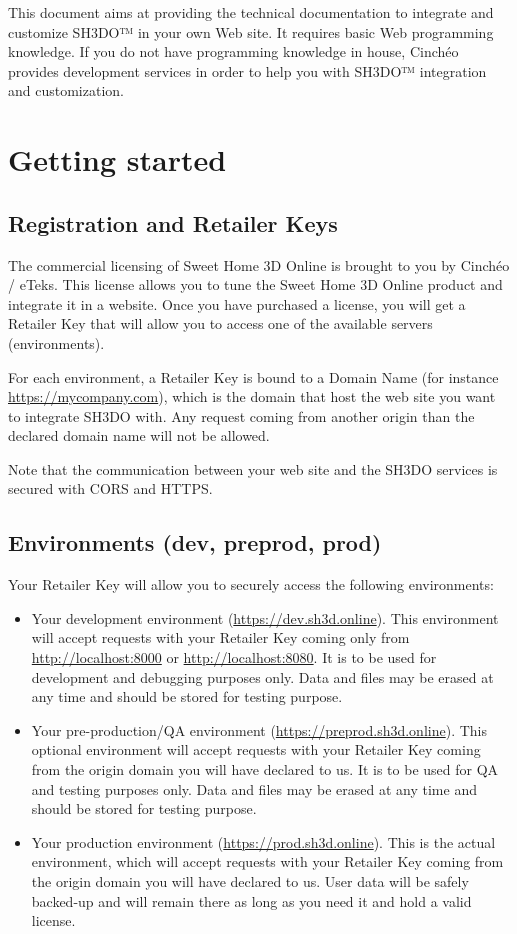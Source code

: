 \documentclass[a4paper]{report}
\begin{document}
This document aims at providing the technical documentation to integrate and customize SH3DO™ in your own Web site. It requires basic Web programming knowledge. If you do not have programming knowledge in house, Cinchéo provides development services in order to help you with SH3DO™ integration and customization.

\chapter{Getting started} 

\section{Registration and Retailer Keys}

The commercial licensing of Sweet Home 3D Online is brought to you by Cinchéo / eTeks. This license allows you to tune the Sweet Home 3D Online product and integrate it in a website. Once you have purchased a license, you will get a Retailer Key that will allow you to access one of the available servers (environments).

For each environment, a Retailer Key is bound to a Domain Name (for instance \url{https://mycompany.com}), which is the domain that host the web site you want to integrate SH3DO with. Any request coming from another origin than the declared domain name will not be allowed.

Note that the communication between your web site and the SH3DO services is secured with CORS and HTTPS.

\section{Environments (dev, preprod, prod)}

Your Retailer Key will allow you to securely access the following environments:

\begin{itemize}
\item Your development environment (\url{https://dev.sh3d.online}). This environment will accept requests with your Retailer Key coming only from \url{http://localhost:8000} or \url{http://localhost:8080}. It is to be used for development and debugging purposes only. Data and files may be erased at any time and should be stored for testing purpose.
\item Your pre-production/QA environment (\url{https://preprod.sh3d.online}). This optional environment will accept requests with your Retailer Key coming from the origin domain you will have declared to us. It is to be used for QA and testing purposes only. Data and files may be erased at any time and should be stored for testing purpose.
\item Your production environment (\url{https://prod.sh3d.online}). This is the actual environment, which will accept requests with your Retailer Key coming from the origin domain you will have declared to us. User data will be safely backed-up and will remain there as long as you need it and hold a valid license.
\end{itemize}
\end{document}
